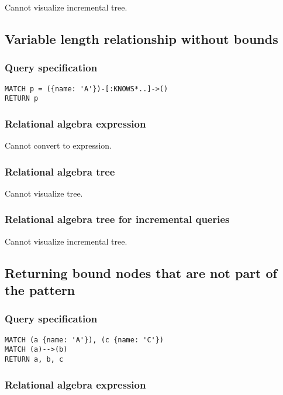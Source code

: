 Cannot visualize incremental tree.

\subsection{Variable length relationship without bounds}

\subsubsection*{Query specification}

\begin{lstlisting}
MATCH p = ({name: 'A'})-[:KNOWS*..]->()
RETURN p
\end{lstlisting}

\subsubsection*{Relational algebra expression}

Cannot convert to expression.

\subsubsection*{Relational algebra tree}

Cannot visualize tree.

\subsubsection*{Relational algebra tree for incremental queries}

Cannot visualize incremental tree.

\subsection{Returning bound nodes that are not part of the pattern}

\subsubsection*{Query specification}

\begin{lstlisting}
MATCH (a {name: 'A'}), (c {name: 'C'})
MATCH (a)-->(b)
RETURN a, b, c
\end{lstlisting}

\subsubsection*{Relational algebra expression}


